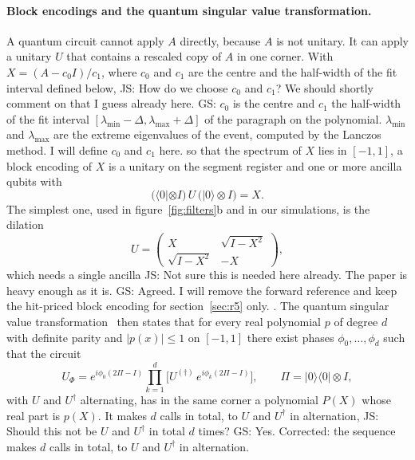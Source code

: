 \documentclass[11pt,a4paper]{article}
\newcommand{\js}[1]{{\color{blue} JS: #1 }}
\newcommand{\gs}[1]{{\color{orange!85!black} GS: #1 }}
\begin{document}
\paragraph{Block encodings and the quantum singular value transformation.}
A quantum circuit cannot apply $A$ directly, because $A$ is not unitary. It can apply a unitary $U$
that contains a rescaled copy of $A$ in one corner. With $X=(A-c_0I)/c_1$, where $c_0$ and $c_1$ are the centre and the half-width of the fit interval
defined below, \js{How do we choose $c_0$ and $c_1$? We should shortly comment on that I guess already here.} \gs{$c_0$ is the centre and $c_1$ the half-width of the fit interval $[\lambda_{\min}-\Delta,\lambda_{\max}+\Delta]$ of the paragraph on the polynomial. $\lambda_{\min}$ and $\lambda_{\max}$ are the extreme eigenvalues of the event, computed by the Lanczos method. I will define $c_0$ and $c_1$ here.  } so that the spectrum
of $X$ lies in $[-1,1]$, a block encoding of $X$ is a unitary on the segment register and one or more
ancilla qubits with
\begin{equation}
\big(\langle0|\otimes I\big)\,U\,\big(|0\rangle\otimes I\big)=X .
\end{equation}
The simplest one, used in figure~\ref{fig:filters}b and in our simulations, is the dilation
\begin{equation}
U=\begin{pmatrix}X&\sqrt{I-X^2}\\ \sqrt{I-X^2}&-X\end{pmatrix},
\end{equation}
which needs a single ancilla \js{Not sure this is needed here already. The paper is heavy enough as it is.} \gs{Agreed. I will remove the forward reference and keep the hit-priced block encoding for section~\ref{sec:r5} only.  }. The quantum singular value
transformation~\cite{gslw2019,martyn2021} then states that for every real polynomial $p$ of degree
$d$ with definite parity and $|p(x)|\le1$ on $[-1,1]$ there exist phases $\phi_0,\dots,\phi_d$ such
that the circuit
\begin{equation}
U_\Phi=e^{i\phi_0(2\Pi-I)}\prod_{k=1}^{d}\Big[U^{(\dagger)}\,e^{i\phi_k(2\Pi-I)}\Big],\qquad \Pi=|0\rangle\langle0|\otimes I,
\end{equation}
with $U$ and $U^\dagger$ alternating, has in the same corner a polynomial $P(X)$ whose real part is
$p(X)$. It makes $d$ calls in total, to $U$ and $U^\dagger$ in alternation, \js{Should this not be $U$ and $U^\dagger$ in total $d$ times?} \gs{Yes. Corrected: the sequence makes $d$ calls in total, to $U$ and $U^\dagger$ in alternation.}
\end{document}
